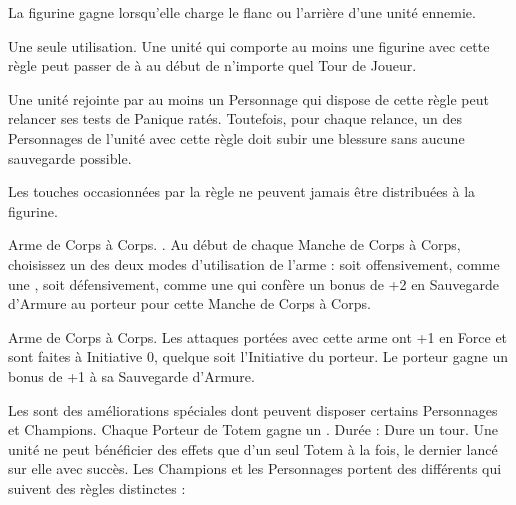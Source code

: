 \armyspecialruleentry{\packtactics}

La figurine gagne \swiftstride{} lorsqu'elle charge le flanc ou l'arrière d'une unité ennemie.

\armyspecialruleentry{\lootedbooze}

Une seule utilisation. Une unité qui comporte au moins une figurine avec cette règle peut passer de \sober{} à \drunk{} au début de n'importe quel Tour de Joueur.

\armyspecialruleentry{\bloodoffering}

Une unité rejointe par au moins un Personnage qui dispose de cette règle peut relancer ses tests de Panique ratés. Toutefois, pour chaque relance, un des Personnages de l'unité avec cette règle doit subir une blessure sans aucune sauvegarde possible.

\armyspecialruleentry{\halfhorse}

Les touches occasionnées par la règle \stomp{} ne peuvent jamais être distribuées à la figurine.

\closearmyspecialrules




\newpage
\startarmyarmoury

\startitemlistonecol

\listitemonecol{\soothsayerstaff}Arme de Corps à Corps. \requirestwohands{}. Au début de chaque Manche de Corps à Corps, choisissez un des deux modes d'utilisation de l'arme : soit offensivement, comme une \gw{}, soit défensivement, comme une \hw{} qui confère un bonus de +2 en Sauvegarde d'Armure au porteur pour cette Manche de Corps à Corps.

\listitemonecol{\beastaxe}Arme de Corps à Corps. Les attaques portées avec cette arme ont +1 en Force et sont faites à Initiative 0, quelque soit l'Initiative du porteur. Le porteur gagne un bonus de +1 à sa Sauvegarde d'Armure.

\enditemlistonecol

\closearmyarmoury





\startarmynewsectionSP{\totems}

\spaceaftersection{}

Les \totems{} sont des améliorations spéciales dont peuvent disposer certains Personnages et Champions. Chaque Porteur de Totem gagne un . Durée : Dure un tour. Une unité ne peut bénéficier des effets que d'un seul Totem à la fois, le dernier lancé sur elle avec succès. Les Champions et les Personnages portent des \totems{} différents qui suivent des règles distinctes :

